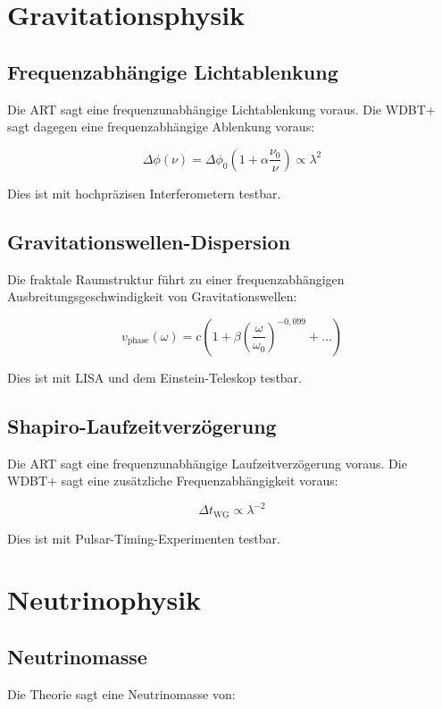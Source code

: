 \section{Gravitationsphysik}

\subsection{Frequenzabhängige Lichtablenkung}

Die ART sagt eine frequenzunabhängige Lichtablenkung voraus. Die WDBT+ sagt dagegen eine frequenzabhängige Ablenkung voraus:

\[
\Delta\phi(\nu) = \Delta\phi_0 \left(1 + \alpha \frac{\nu_0}{\nu}\right) \propto \lambda^2
\]

Dies ist mit hochpräzisen Interferometern testbar.

\subsection{Gravitationswellen-Dispersion}

Die fraktale Raumstruktur führt zu einer frequenzabhängigen Ausbreitungsgeschwindigkeit von Gravitationswellen:

\[
v_{\text{phase}}(\omega) = c \left(1 + \beta \left(\frac{\omega}{\omega_0}\right)^{-0,099} + \dots\right)
\]

Dies ist mit LISA und dem Einstein-Teleskop testbar.

\subsection{Shapiro-Laufzeitverzögerung}

Die ART sagt eine frequenzunabhängige Laufzeitverzögerung voraus. Die WDBT+ sagt eine zusätzliche Frequenzabhängigkeit voraus:

\[
\Delta t_{\text{WG}} \propto \lambda^{-2}
\]

Dies ist mit Pulsar-Timing-Experimenten testbar.

\section{Neutrinophysik}

\subsection{Neutrinomasse}

Die Theorie sagt eine Neutrinomasse von:

